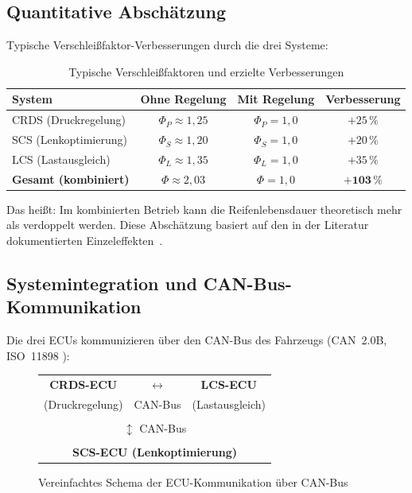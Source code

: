 ﻿\documentclass[12pt,a4paper]{article}
\theoremstyle{definition}
\theoremstyle{remark}
\begin{document}
\subsection{Quantitative Abschätzung}

Typische Verschleißfaktor-Verbesserungen durch die drei Systeme:

\begin{table}[H]
\centering
\caption{Typische Verschleißfaktoren und erzielte Verbesserungen}
\label{tab:improvement}
\begin{tabular}{lccc}
\toprule
\textbf{System} & \textbf{Ohne Regelung} & \textbf{Mit Regelung} & \textbf{Verbesserung}\\
\midrule
CRDS (Druckregelung)     & $\Phi_P \approx 1{,}25$ & $\Phi_P = 1{,}0$ & $+25\,\%$ \\
SCS (Lenkoptimierung)    & $\Phi_S \approx 1{,}20$ & $\Phi_S = 1{,}0$ & $+20\,\%$ \\
LCS (Lastausgleich)      & $\Phi_L \approx 1{,}35$ & $\Phi_L = 1{,}0$ & $+35\,\%$ \\
\midrule
\textbf{Gesamt (kombiniert)} & $\Phi \approx 2{,}03$ & $\Phi = 1{,}0$ & $\mathbf{+103\,\%}$\\
\bottomrule
\end{tabular}
\end{table}

Das heißt: Im kombinierten Betrieb kann die Reifenlebensdauer theoretisch
mehr als verdoppelt werden. Diese Abschätzung basiert auf den in der Literatur
dokumentierten Einzeleffekten~\cite{Sandberg2011, Niskanen2014, Gent2006}.

\subsection{Systemintegration und CAN-Bus-Kommunikation}

Die drei ECUs kommunizieren über den CAN-Bus des Fahrzeugs (CAN~2.0B,
ISO~11898 \cite{Bosch1991}):

\begin{figure}[H]
\centering
\begin{tabular}{|c|c|c|}
\hline
\textbf{CRDS-ECU} & $\longleftrightarrow$ & \textbf{LCS-ECU}\\
(Druckregelung) & CAN-Bus & (Lastausgleich)\\
\hline
\multicolumn{3}{|c|}{}\\
\multicolumn{3}{|c|}{$\updownarrow$ CAN-Bus}\\
\multicolumn{3}{|c|}{}\\
\hline
\multicolumn{3}{|c|}{\textbf{SCS-ECU (Lenkoptimierung)}}\\
\hline
\end{tabular}
\caption{Vereinfachtes Schema der ECU-Kommunikation über CAN-Bus}
\label{fig:can_schema}
\end{figure}
\end{document}
